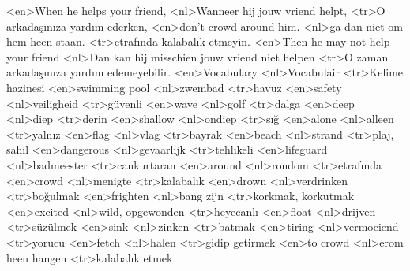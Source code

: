 <en>When he helps your friend,
<nl>Wanneer hij jouw vriend helpt,
<tr>O arkadaşınıza yardım ederken,
<en>don’t crowd around him.
<nl>ga dan niet om hem heen staan.
<tr>etrafında kalabalık etmeyin.
<en>Then he may not help your friend
<nl>Dan kan hij misschien jouw vriend niet helpen
<tr>O zaman arkadaşınıza yardım edemeyebilir.
<en>Vocabulary
<nl>Vocabulair
<tr>Kelime hazinesi
<en>swimming pool
<nl>zwembad
<tr>havuz
<en>safety
<nl>veiligheid
<tr>güvenli
<en>wave
<nl>golf
<tr>dalga
<en>deep
<nl>diep
<tr>derin
<en>shallow
<nl>ondiep
<tr>sığ
<en>alone
<nl>alleen
<tr>yalnız
<en>flag
<nl>vlag
<tr>bayrak
<en>beach
<nl>strand
<tr>plaj, sahil
<en>dangerous
<nl>gevaarlijk
<tr>tehlikeli
<en>lifeguard
<nl>badmeester
<tr>cankurtaran
<en>around
<nl>rondom
<tr>etrafında
<en>crowd
<nl>menigte
<tr>kalabalık
<en>drown
<nl>verdrinken
<tr>boğulmak
<en>frighten
<nl>bang zijn
<tr>korkmak, korkutmak
<en>excited
<nl>wild, opgewonden
<tr>heyecanlı
<en>float
<nl>drijven
<tr>süzülmek
<en>sink
<nl>zinken
<tr>batmak
<en>tiring
<nl>vermoeiend
<tr>yorucu
<en>fetch
<nl>halen
<tr>gidip getirmek
<en>to crowd
<nl>erom heen hangen
<tr>kalabalık etmek
